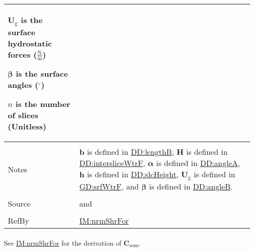 \documentclass[12pt]{article}
\begin{document}
\begin{minipage}{\textwidth}
\begin{tabular}{>{\raggedright}p{}>{\raggedright\arraybackslash}p{}}
\begin{symbDescription}
              \item{${\symbf{U}_{\text{g}}}$ is the surface hydrostatic forces ($\frac{\text{N}}{\text{m}}$)}
              \item{$\symbf{β}$ is the surface angles (${{}^{\circ}}$)}
              \item{$n$ is the number of slices (Unitless)}
              \end{symbDescription}
\\ \midrule \\
Notes & $\symbf{b}$ is defined in \hyperref[DD:lengthB]{DD:lengthB}, $\symbf{H}$ is defined in \hyperref[DD:intersliceWtrF]{DD:intersliceWtrF}, $\symbf{α}$ is defined in \hyperref[DD:angleA]{DD:angleA}, $\symbf{h}$ is defined in \hyperref[DD:slcHeight]{DD:slcHeight}, ${\symbf{U}_{\text{g}}}$ is defined in \hyperref[GD:srfWtrF]{GD:srfWtrF}, and $\symbf{β}$ is defined in \hyperref[DD:angleB]{DD:angleB}.
        
\\ \midrule \\
Source & \cite{chen2005} and \cite{karchewski2012}
         
\\ \midrule \\
RefBy & \hyperref[IM:nrmShrFor]{IM:nrmShrFor}
        
\\ \bottomrule
\end{tabular}
\end{minipage}
\paragraph{}
\label{IM:nrmShrForNumDeriv}
See \hyperref[IM:nrmShrFor]{IM:nrmShrFor} for the derivation of ${\symbf{C}_{\text{num}}}$.
\end{document}
